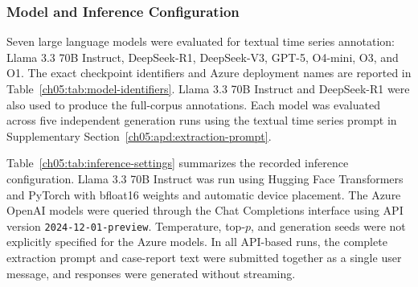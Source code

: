 \subsubsection{Model and Inference Configuration}
\label{ch05:sec:supp-model-configuration}

Seven large language models were evaluated for textual time series annotation:
Llama 3.3 70B Instruct, DeepSeek-R1, DeepSeek-V3, GPT-5, O4-mini, O3,
and O1.
The exact checkpoint identifiers and Azure deployment names are
reported in Table~\ref{ch05:tab:model-identifiers}.
Llama 3.3 70B Instruct and
DeepSeek-R1 were also used to produce the full-corpus annotations.
Each model
was evaluated across five independent generation runs using the textual time
series prompt in Supplementary Section~\ref{ch05:apd:extraction-prompt}.


Table~\ref{ch05:tab:inference-settings} summarizes the recorded inference
configuration.
Llama 3.3 70B Instruct was run using Hugging Face Transformers
and PyTorch with bfloat16 weights and automatic device placement.
The Azure
OpenAI models were queried through the Chat Completions interface using API
version \texttt{2024-12-01-preview}.
Temperature, top-$p$, and generation seeds
were not explicitly specified for the Azure models.
In all API-based runs, the
complete extraction prompt and case-report text were submitted together as a
single user message, and responses were generated without streaming.







